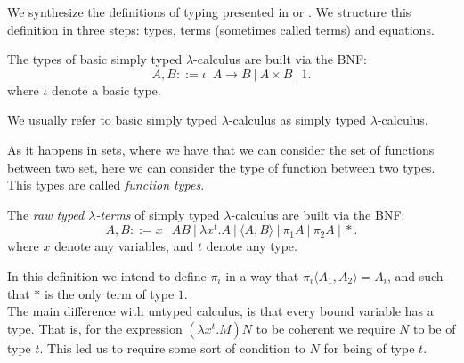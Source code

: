  We synthesize the definitions of typing presented in \cite{lambek1988introduction} or \cite{selinger2008lecture}. We structure this definition in three steps: types, terms (sometimes called terms) and equations.


\begin{definition}
  The types of basic simply typed $\lambda$-calculus are built via the BNF:
  $$A,B ::= \iota |\ A\to B\ |\ A \times B  \ |\ 1.$$
  where $\iota$ denote a basic type. 
\end{definition}
\begin{remark}
We usually refer to basic simply typed $\lambda$-calculus as simply typed $\lambda$-calculus.
\end{remark}




As it happens in sets, where we have that we can consider the set of functions between two set, here we can consider the type of function between two types. This types are called \emph{function types}.\\




\begin{definition}
  The \emph{raw typed $\lambda$-terms} of simply typed $\lambda$-calculus are built via the BNF:
  $$A,B ::= x\ |\ AB\ |\ \lambda x^t.A \ |\ \langle A,B \rangle\ |\ \pi_1A\ |\ \pi_2A\ |\ *.$$
  where $x$ denote any variables, and $t$ denote any type. 
\end{definition}
\begin{definition}
  
\end{definition}


In this definition we intend to define $\pi_i$ in a way that $\pi_i \langle A_1,A_2\rangle = A_i$, and such that $*$ is the only term of type $1$.\\

The main difference with untyped calculus, is that every bound variable has a type. That is, for the expression $(\lambda x^t.M)N$ to be coherent we require $N$ to be of type $t$. This led us to require some sort of condition to $N$ for being of type $t$.\\

